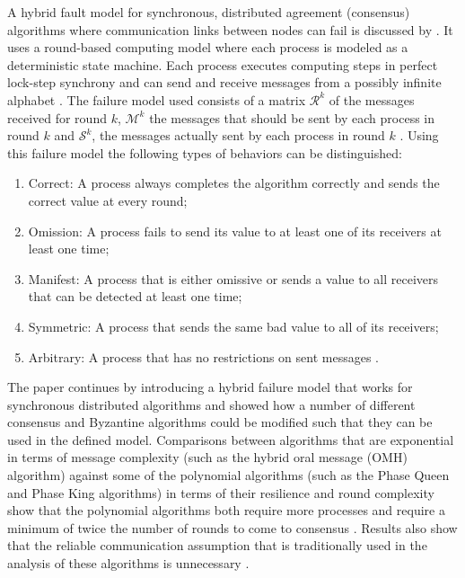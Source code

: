 \documentclass[twoside, conference]{IEEEtran}%
\begin{document}
A hybrid fault model for synchronous, distributed agreement (consensus) algorithms where communication links between nodes can fail is discussed by \cite{Biely2011}.  It uses a round-based computing model where each process is modeled as a deterministic state machine.  Each process executes computing steps in perfect lock-step synchrony and can send and receive messages from a possibly infinite alphabet \cite{Biely2011}.  The failure model used consists of a matrix $\mathcal{R}^k$ of the messages received for round $k$, $\mathcal{M}^k$ the messages that should be sent by each process in round $k$ and $\mathcal{S}^k$, the messages actually sent by each process in round $k$ \cite{Biely2011}.  Using this failure model the following types of behaviors can be distinguished:
\begin{enumerate}
	\item Correct: A process always completes the algorithm correctly and sends the correct value at every round;
	\item Omission: A process fails to send its value to at least one of its receivers at least one time;
	\item Manifest: A process that is either omissive or sends a value to all receivers that can be detected at least one time;
	\item Symmetric: A process that sends the same bad value to all of its receivers;
	\item Arbitrary: A process that has no restrictions on sent messages \cite{Biely2011}.
\end{enumerate}
The paper continues by introducing a hybrid failure model that works for synchronous distributed algorithms \cite{Biely2011} and showed how a number of different consensus and Byzantine algorithms could be modified such that they can be used in the defined model.  Comparisons between algorithms that are exponential in terms of message complexity (such as the hybrid oral message (OMH) algorithm) against some of the polynomial algorithms (such as the Phase Queen and Phase King algorithms) in terms of their resilience and round complexity show that the polynomial algorithms both require more processes and require a minimum of twice the number of rounds to come to consensus \cite{Biely2011}.  Results also show that the reliable communication assumption that is traditionally used in the analysis of these algorithms is unnecessary \cite{Biely2011}.
\end{document}

